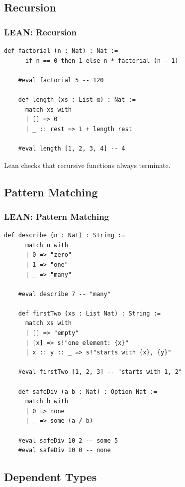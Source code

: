 \documentclass{beamer}
\begin{document}
\subsection{Recursion}

\begin{frame}[fragile]
  \frametitle{LEAN: Recursion}

  \begin{lstlisting}[language=lean]
    def factorial (n : Nat) : Nat :=
      if n == 0 then 1 else n * factorial (n - 1)

    #eval factorial 5 -- 120

    def length (xs : List α) : Nat :=
      match xs with
      | [] => 0
      | _ :: rest => 1 + length rest

    #eval length [1, 2, 3, 4] -- 4
  \end{lstlisting}

  \vspace{5mm}

  Lean checks that recursive functions always terminate.
\end{frame}

\subsection{Pattern Matching}

\begin{frame}[fragile]
  \frametitle{LEAN: Pattern Matching}

  \begin{lstlisting}[language=lean]
    def describe (n : Nat) : String :=
      match n with
      | 0 => "zero"
      | 1 => "one"
      | _ => "many"

    #eval describe 7 -- "many"

    def firstTwo (xs : List Nat) : String :=
      match xs with
      | [] => "empty"
      | [x] => s!"one element: {x}"
      | x :: y :: _ => s!"starts with {x}, {y}"

    #eval firstTwo [1, 2, 3] -- "starts with 1, 2"

    def safeDiv (a b : Nat) : Option Nat :=
      match b with
      | 0 => none
      | _ => some (a / b)

    #eval safeDiv 10 2 -- some 5
    #eval safeDiv 10 0 -- none
  \end{lstlisting}
\end{frame}

\subsection{Dependent Types}
\end{document}

